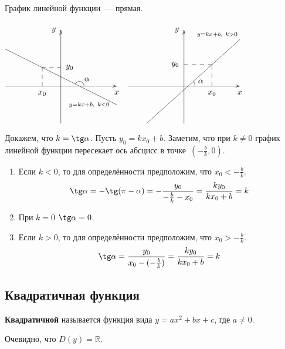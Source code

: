 График линейной функции~--- прямая.
\begin{center}
$\begin{xy} /r8mm/:
(-3, 0); (3, 0) **@{-} *@{>} *++!U{x};
(0, -2); (0, 3) **@{-} *@{>} *++!R{y};
(-3, 2); (3, -1) **@{-} *+++!R{\scriptstyle y = kx + b, \ k < 0};
{(1, 0) \ellipse<2mm>:a(90),_,:a(-63.435){}} *++!LD{\alpha};
(-1, 1) = "M"; (-1, 0) **@{--} *++!U{x_0};
"M"; (0, 1) **@{--} *++!L{y_0};
\end{xy}$
$\begin{xy} /r8mm/:
(-3, 0); (3, 0) **@{-} *@{>} *++!U{x};
(0, -2); (0, 3) **@{-} *@{>} *++!R{y};
(-2, -2); (3, 2.5) **@{-} *+!DR{\scriptstyle y = kx + b, \ k > 0};
{(0.222, 0) \ellipse<3mm>:a(48.013),^,:a(90){}};
(0.9, 0.25) *{\alpha};
(1.5, 1.15) = "M"; (1.5, 0) **@{--} *++!U{x_0};
"M"; (0, 1.15) **@{--} *++!R{y_0};
\end{xy}$
\end{center}

Докажем, что $k = \tg \alpha$.
Пусть $y_0 = k x_0 + b$.
Заметим, что при $k \neq 0$ график линейной функции пересекает ось абсцисс в точке~$(-\frac{b}k, 0)$.
\begin{enumerate}
	\item Если $k < 0$, то для определённости предположим, что $x_0 < -\frac{b}k$.
	\begin{equation*}
	\tg \alpha =
	-\tg (\pi - \alpha) =
	-\frac{y_0}{-\frac{b}k - x_0} =
	\frac{k y_0}{k x_0 + b} =
	k
	\end{equation*}
	
	\item При $k = 0$ $\tg \alpha = 0$.
	
	\item Если $k > 0$, то для определённости предположим, что $x_0 > -\frac{b}k$.
	\begin{equation*}
	\tg \alpha =
	\frac{y_0}{x_0 - (-\frac{b}k)} =
	\frac{k y_0}{k x_0 + b} =
	k
	\end{equation*}
\end{enumerate}

\subsection{Квадратичная функция}
 \textbf{Квадратичной} называется функция вида $y = ax^2 + bx + c$, где $a \neq 0$.

Очевидно, что $D(y) = \mathbb R$.


